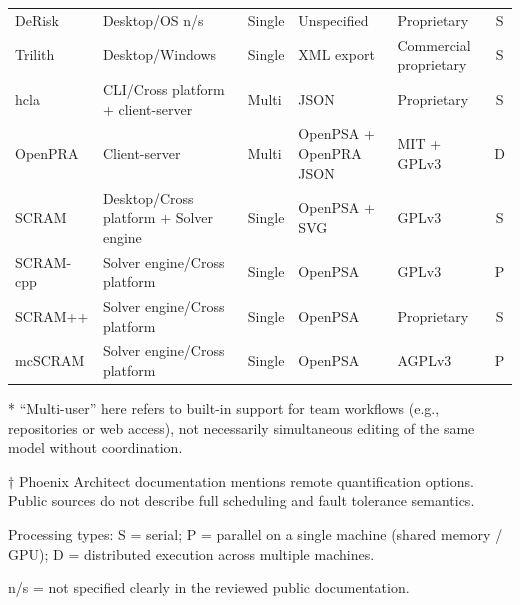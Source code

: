 \begin{landscape}
\begin{table}
\begin{threeparttable}
\begin{tabularx}{\textwidth}{@{} L{1.20} L{1.30} L{0.60} L{1.55} L{0.85} C{0.50} @{}}
DeRisk &
Desktop/OS n/s &
Single &
Unspecified &
Proprietary &
S \\

Trilith &
Desktop/Windows &
Single &
XML export &
Commercial proprietary &
S \\

\acrshort{hcla} &
CLI/Cross platform + client-server &
Multi &
JSON &
Proprietary &
S \\

OpenPRA &
Client-server &
Multi &
OpenPSA + OpenPRA JSON &
MIT + GPLv3 &
D \\

SCRAM &
Desktop/Cross platform + Solver engine &
Single &
OpenPSA + SVG &
GPLv3 &
S \\

SCRAM-cpp &
Solver engine/Cross platform &
Single &
OpenPSA &
GPLv3 &
P \\

SCRAM++ &
Solver engine/Cross platform &
Single &
OpenPSA &
Proprietary &
S \\

mcSCRAM &
Solver engine/Cross platform &
Single &
OpenPSA &
AGPLv3 &
P \\

\bottomrule
\end{tabularx}

\begin{tablenotes}
  \item[*] ``Multi-user'' here refers to built-in support for team workflows (e.g., repositories or web access), not necessarily simultaneous editing of the same model without coordination.
  \item[$\dagger$] Phoenix Architect documentation mentions remote quantification options. Public sources do not describe full scheduling and fault tolerance semantics.
  \item[] Processing types: S = serial; P = parallel on a single machine (shared memory / GPU); D = distributed execution across multiple machines.
  \item[] n/s = not specified clearly in the reviewed public documentation.
\end{tablenotes}

\end{threeparttable}
\end{table}
\end{landscape}